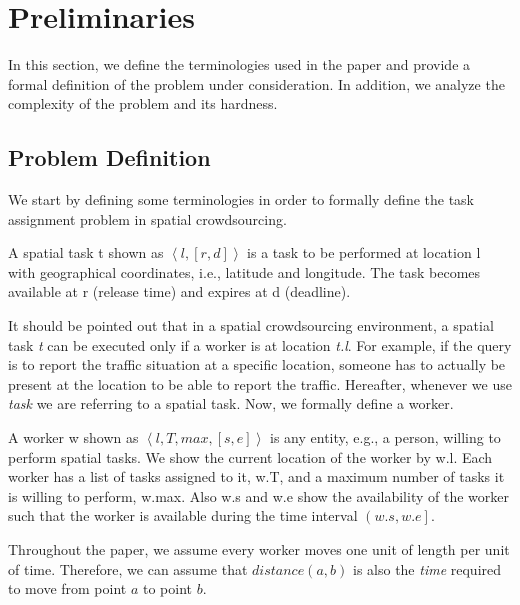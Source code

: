 \vspace{-0.15in}
\section{Preliminaries}
\label{sec:prelim}
\vspace{-0.05in}
In this section, we define the terminologies used in the paper and provide a formal definition of the problem under consideration. In addition, we analyze the complexity of the problem and its hardness.
\vspace{-0.1in}
\subsection{Problem Definition}
\label{subsec:problemdef}
\vspace{-0.05in}
We start by defining some terminologies in order to formally define the task assignment problem in spatial crowdsourcing.
\vspace{-0.05in}
\begin{definition} 
A spatial task t shown as $\left\langle l, [r, d] \right\rangle$ is a task to be performed at location l with geographical coordinates, i.e., latitude and longitude. The task becomes available at r (release time) and expires at d (deadline).
\end{definition}
\vspace{-0.05in}
It should be pointed out that in a spatial crowdsourcing environment, a spatial task \emph{t} can be executed only if a worker is at location \emph{t.l}. For example, if the query is to report the traffic situation at a specific location, someone has to actually be present at the location to be able to report the traffic. Hereafter, whenever we use \emph{task} we are referring to a spatial task. Now, we formally define a worker.
\vspace{-0.05in}
\begin{definition} [Worker]
A worker w shown as $\left\langle l, T, max, [s, e] \right\rangle$ is any entity, e.g., a person, willing to perform spatial tasks. We show the current location of the worker by w.l. Each worker has a list of tasks assigned to it, w.T, and a maximum number of tasks it is willing to perform, w.max. Also w.s and w.e show the availability of the worker such that the worker is available during the time interval $\left( w.s, w.e \right]$.
\end{definition}
\vspace{-0.05in}
Throughout the paper, we assume every worker moves one unit of length per unit of time. Therefore, we can assume that $distance \left( a,b \right)$ is also the \emph{time} required to move from point $a$ to point $b$.
